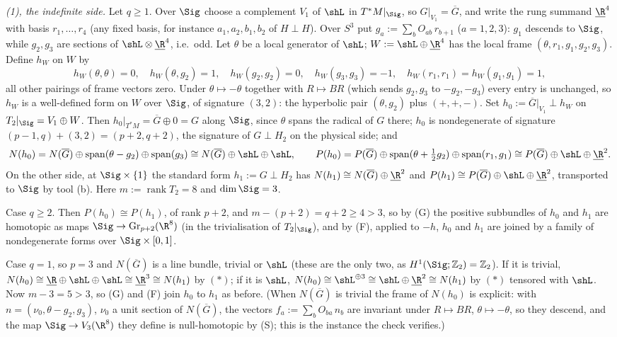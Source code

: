 \emph{(1), the indefinite side.} Let $q \geq 1$. Over $\Sig$ choose a complement $V_1$ of $\shL$ in $T^*M|_\Sig$, so $G|_{V_1} = \overline G$, and write the rung summand $\underline{\R}^{4}$ with basis $r_1, \dots, r_4$ (any fixed basis, for instance $a_1, a_2, b_1, b_2$ of $H \perp H$). Over $S^{3}$ put $g_a := \sum_b O_{ab}\, r_{b+1}$ ($a = 1,2,3$): $g_1$ descends to $\Sig$, while $g_2, g_3$ are sections of $\shL \otimes \underline{\R}^{4}$, i.e.\ odd. Let $\theta$ be a local generator of $\shL$; $W := \shL \oplus \underline{\R}^{4}$ has the local frame $(\theta, r_1, g_1, g_2, g_3)$. Define $h_W$ on $W$ by
\[
h_W(\theta,\theta) = 0,\quad h_W(\theta, g_2) = 1,\quad h_W(g_2,g_2) = 0,\quad h_W(g_3,g_3) = -1,\quad h_W(r_1,r_1) = h_W(g_1,g_1) = 1,
\]
all other pairings of frame vectors zero. Under $\theta \mapsto -\theta$ together with $R \mapsto BR$ (which sends $g_2, g_3$ to $-g_2, -g_3$) every entry is unchanged, so $h_W$ is a well-defined form on $W$ over $\Sig$, of signature $(3,2)$: the hyperbolic pair $(\theta, g_2)$ plus $(+,+,-)$. Set $h_0 := \overline G|_{V_1} \perp h_W$ on $T_2|_\Sig = V_1 \oplus W$. Then $h_0|_{T^*M} = \overline G \oplus 0 = G$ along $\Sig$, since $\theta$ spans the radical of $G$ there; $h_0$ is nondegenerate of signature $(p-1,q) + (3,2) = (p+2, q+2)$, the signature of $G \perp H_2$ on the physical side; and
\[
N(h_0) = N(\overline G) \oplus \operatorname{span}(\theta - g_2) \oplus \operatorname{span}(g_3) \cong N(\overline G) \oplus \shL \oplus \shL, \qquad P(h_0) = P(\overline G) \oplus \operatorname{span}(\theta + \tfrac12 g_2) \oplus \operatorname{span}(r_1, g_1) \cong P(\overline G) \oplus \shL \oplus \underline{\R}^{2}.
\]
On the other side, at $\Sig \times \{1\}$ the standard form $h_1 := G \perp H_2$ has $N(h_1) \cong N(\overline G) \oplus \underline{\R}^{2}$ and $P(h_1) \cong P(\overline G) \oplus \shL \oplus \underline{\R}^{2}$, transported to $\Sig$ by tool (b). Here $m := \operatorname{rank} T_2 = 8$ and $\dim \Sig = 3$.

Case $q \geq 2$. Then $P(h_0) \cong P(h_1)$, of rank $p + 2$, and $m - (p+2) = q + 2 \geq 4 > 3$, so by (G) the positive subbundles of $h_0$ and $h_1$ are homotopic as maps $\Sig \to \mathrm{Gr}_{p+2}(\R^{8})$ (in the trivialisation of $T_2|_\Sig$), and by (F), applied to $-h$, $h_0$ and $h_1$ are joined by a family of nondegenerate forms over $\Sig \times [0,1]$.

Case $q = 1$, so $p = 3$ and $N(\overline G)$ is a line bundle, trivial or $\shL$ (these are the only two, as $H^{1}(\Sig;\mathbb{Z}_2) = \mathbb{Z}_2$). If it is trivial, $N(h_0) \cong \underline\R \oplus \shL \oplus \shL \cong \underline{\R}^{3} \cong N(h_1)$ by $(*)$; if it is $\shL$, $N(h_0) \cong \shL^{\oplus 3} \cong \shL \oplus \underline{\R}^{2} \cong N(h_1)$ by $(*)$ tensored with $\shL$. Now $m - 3 = 5 > 3$, so (G) and (F) join $h_0$ to $h_1$ as before. (When $N(\overline G)$ is trivial the frame of $N(h_0)$ is explicit: with $n = (\nu_0, \theta - g_2, g_3)$, $\nu_0$ a unit section of $N(\overline G)$, the vectors $f_a := \sum_b O_{ba}\, n_b$ are invariant under $R \mapsto BR$, $\theta \mapsto -\theta$, so they descend, and the map $\Sig \to V_3(\R^{8})$ they define is null-homotopic by (S); this is the instance the check verifies.)

